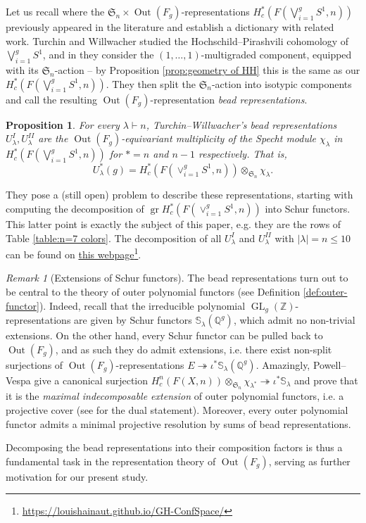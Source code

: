 \documentclass[12pt]{article}
\newcommand{\Z}{\mathbb{Z}}
\newcommand{\Q}{\mathbb{Q}}
\newcommand{\SymGroup}[1][n]{\mathfrak{S}_{#1}}
\newcommand{\Specht}[1]{\chi_{#1}}
\newcommand{\TransposePartition}[1]{{#1}^{\ast}}
\newcommand{\Schur}[1]{\mathbb{S}_{#1}}
\newcommand{\onto}{\twoheadrightarrow}
\DeclareMathOperator{\GL}{GL}
\DeclareMathOperator{\gr}{gr}
\DeclareMathOperator{\Out}{Out}
\theoremstyle{plain}
\newtheorem{prop}[thm]{Proposition}
\theoremstyle{definition}
\theoremstyle{remark}
\newtheorem{rmk}[thm]{Remark}
\begin{document}
Let us recall where the $\SymGroup\times \Out(F_g)$-representations $H^*_c(F(\bigvee_{i=1}^g S^1,n))$ previously appeared in the literature and establish a dictionary with related work. Turchin and Willwacher studied the Hochschild--Pirashvili cohomology of $\bigvee_{i=1}^g S^1$, and in \cite[Section 2.5]{TW19} they consider the $(1,\ldots,1)$-multigraded component, equipped with its $\SymGroup$-action -- by Proposition \ref{prop:geometry of HH} this is the same as our $H^*_c(F(\bigvee_{i=1}^g S^1,n))$. They then split the $\SymGroup$-action into isotypic components and call the resulting $\Out(F_g)$-representation \emph{bead representations}.
\begin{prop}\label{cor:bead}
For every $\lambda \vdash n$, Turchin--Willwacher's bead representations $U_\lambda^{I},U_\lambda^{II}$ are the $\Out(F_g)$-equivariant multiplicity of the Specht module $\Specht{\lambda}$ in $H^*_c(F(\bigvee_{i=1}^g S^1, n))$ for $* = n$ and $n-1$ respectively. That is,
\begin{equation}
    U_\lambda^*(g) = H^*_c(F(\vee_{i=1}^g S^1, n))\otimes_{\SymGroup} \Specht{\lambda}.
\end{equation}
\end{prop}
They pose a (still open) problem to describe these representations, starting with computing the decomposition of $\gr H^*_c(F(\vee_{i=1}^g S^1, n))$ into Schur functors. This latter point is exactly the subject of this paper, e.g. they are the rows of Table \ref{table:n=7 colors}. The decomposition of all $U_{\lambda}^{I}$ and $U_{\lambda}^{II}$ with $|\lambda| = n\leq 10$ can be found on \href{https://louishainaut.github.io/GH-ConfSpace/}{this webpage}\footnote{\url{https://louishainaut.github.io/GH-ConfSpace/}}.

\begin{rmk}[Extensions of Schur functors]
The bead representations turn out to be central to the theory of outer polynomial functors (see Definition \ref{def:outer-functor}). Indeed, recall that the irreducible polynomial $\GL_g(\Z)$-representations are given by Schur functors $\Schur{\lambda}(\Q^g)$, which admit no non-trivial extensions. On the other hand, every Schur functor can be pulled back to $\Out(F_g)$, and as such they do admit extensions, i.e. there exist non-split surjections of $\Out(F_g)$-representations $E \onto \iota^*\Schur{\lambda}(\Q^g)$. Amazingly,
Powell--Vespa give a canonical surjection $H^n_c(F(X,n)) \otimes_{\SymGroup} \Specht{\TransposePartition{\lambda}} \onto \iota^* \Schur{\lambda}$ and prove that 
it is the \emph{maximal indecomposable extension} of outer polynomial functors, i.e. a projective cover (see \cite[Theorem 19.1]{PV18} for the dual statement). Moreover, every outer polynomial functor
admits a minimal projective resolution by sums of bead representations.

Decomposing the bead representations into their composition factors is thus a fundamental task in the representation theory of $\Out(F_g)$, serving as further motivation for our present study.
\end{rmk}
\end{document}

